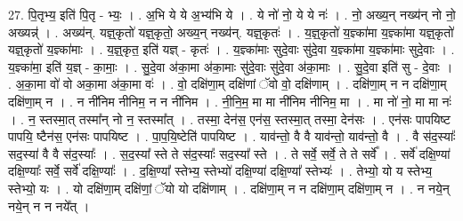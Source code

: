 \documentclass[17pt]{extarticle}
\begin{document}
27. पि॒तृभ्य॒ इति॑ पि॒तृ - भ्यः॒ । . अ॒भि ये ये अ॒भ्य॑भि ये । . ये नो॑ नो॒ ये ये नः॑ । . नो॒ अख्य॒न् नख्य॑न् नो नो॒ अख्यन्न्॑ । . अख्य॑न्. यज्ञ्॒कृतो॑ यज्ञ्॒कृतो॒ अख्य॒न् नख्य॑न्. यज्ञ्॒कृतः॑ । . य॒ज्ञ्॒कृतो॑ य॒ज्ञ्का॑मा य॒ज्ञ्का॑मा यज्ञ्॒कृतो॑ यज्ञ्॒कृतो॑ य॒ज्ञ्का॑माः । . य॒ज्ञ्॒कृत॒ इति॑ यज्ञ् - कृतः॑ । . य॒ज्ञ्का॑माः सुदे॒वाः सु॑दे॒वा य॒ज्ञ्का॑मा य॒ज्ञ्का॑माः सुदे॒वाः । . य॒ज्ञ्का॑मा॒ इति॑ य॒ज्ञ् - का॒माः॒ । . सु॒दे॒वा अ॑का॒मा अ॑का॒माः सु॑दे॒वाः सु॑दे॒वा अ॑का॒माः । . सु॒दे॒वा इति॑ सु - दे॒वाः । . अ॒का॒मा वो॑ वो अका॒मा अ॑का॒मा वः॑ । . वो॒ दक्षि॑णा॒म् दक्षि॑णां ॅवो वो॒ दक्षि॑णाम् । . दक्षि॑णा॒म् न न दक्षि॑णा॒म् दक्षि॑णा॒म् न । . न नी॑निम नीनिम॒ न न नी॑निम । . नी॒नि॒म॒ मा मा नी॑निम नीनिम॒ मा । . मा नो॑ नो॒ मा मा नः॑ । . न॒ स्तस्मा॒त् तस्मा᳚न् नो न॒ स्तस्मा᳚त् । . तस्मा॒ देन॑स॒ एन॑स॒ स्तस्मा॒त् तस्मा॒ देन॑सः । . एन॑सः पापयिष्ट पापयि॒ ष्टैन॑स॒ एन॑सः पापयिष्ट । . पा॒प॒यि॒ष्टेति॑ पापयिष्ट । . याव॑न्तो॒ वै वै याव॑न्तो॒ याव॑न्तो॒ वै । . वै स॑द॒स्याः᳚ सद॒स्या॑ वै वै स॑द॒स्याः᳚ । . स॒द॒स्या᳚ स्ते ते स॑द॒स्याः᳚ सद॒स्या᳚ स्ते । . ते सर्वे॒ सर्वे॒ ते ते सर्वे᳚ । . सर्वे॑ दक्षि॒ण्या॑ दक्षि॒ण्याः᳚ सर्वे॒ सर्वे॑ दक्षि॒ण्याः᳚ । . द॒क्षि॒ण्या᳚ स्तेभ्य॒ स्तेभ्यो॑ दक्षि॒ण्या॑ दक्षि॒ण्या᳚ स्तेभ्यः॑ । . तेभ्यो॒ यो य स्तेभ्य॒ स्तेभ्यो॒ यः । . यो दक्षि॑णा॒म् दक्षि॑णां॒ ॅयो यो दक्षि॑णाम् । . दक्षि॑णा॒म् न न दक्षि॑णा॒म् दक्षि॑णा॒म् न । . न नये॒न् नये॒न् न न नये᳚त् । \newline
\end{document}
